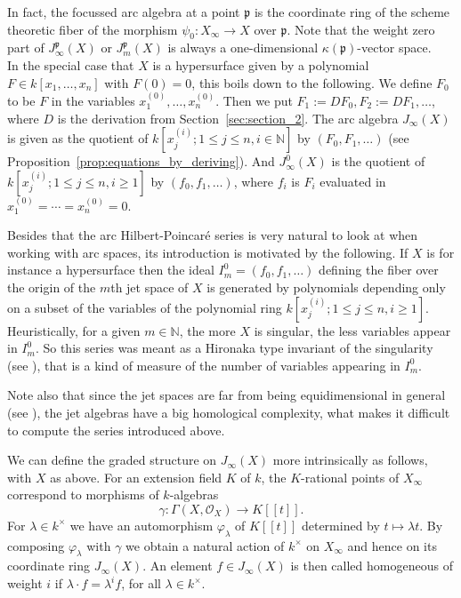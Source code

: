 In fact, the focussed arc algebra at a point $\mathfrak{p}$ is the coordinate ring of the scheme theoretic fiber of the morphism $\psi_0 : X_{\infty} \to X$ over $\mathfrak{p}$. Note that the weight zero part of $J_{\infty}^{\mathfrak{p}}(X)$ or $J_{m}^{\mathfrak{p}}(X)$ is always a one-dimensional $\kappa(\mathfrak{p})$-vector space. \\

In the special case that $X$ is a hypersurface given by a polynomial $F\in k[x_1,\ldots,x_n]$ with $F(0)=0$, this boils down to the following. We define $F_0$ to be $F$ in the variables $x_1^{(0)},\ldots , x_n^{(0)}$. Then we put $F_1:= DF_0, F_2:=DF_1,\ldots $, where $D$ is the derivation from Section~\ref{sec:section_2}.
The arc algebra $J_{\infty}(X)$ is given as the quotient of $k[x_j^{(i)}; 1\leq j\leq n, i\in \mathbb{N}]$ by $(F_0,F_1,\ldots )$ (see Proposition~\ref{prop:equations_by_deriving}). And $J_{\infty}^0(X)$ is the quotient of $k[x_j^{(i)}; 1\leq j\leq n, i\geq 1]$ by $(f_0,f_1,\ldots )$, where $f_i$ is $F_i$ evaluated in $x_1^{(0)}= \cdots = x_n^{(0)} = 0$.

\begin{Rem}
Besides that the arc Hilbert-Poincar\'{e} series is very natural to look
at when working with arc spaces, its introduction is motivated by the
following. If $X$ is for instance a hypersurface then the ideal $I_m^0 = (f_0,f_1,\ldots )$ defining the fiber over the origin of the $m$th jet space of $X$ is generated by polynomials depending only on a subset of the variables
of the polynomial ring $k[x_j^{(i)}; 1\leq j\leq n, i\geq 1]$. Heuristically,
for a given $m \in \mathbb{N}$, the more $X$ is singular, the less
variables appear in $I_m^0$. So this series was meant as a
Hironaka type invariant of the singularity (see
\cite{berthomieu_hivert_mourtada}), that is a kind of measure of the
number of variables appearing in $I^{0}_m$.

Note also that since the jet spaces are far from being equidimensional
in general (see
\cite{mourtada_plane_branches,mourtada_toric_surfaces}), the jet
algebras have a big homological complexity, what makes it difficult to
compute the series introduced above.
\end{Rem}

\begin{Rem}\label{rem:graded_structure}
We can define the graded structure on $J_{\infty}(X)$ more intrinsically as follows, with $X$ as above. For an extension field $K$ of $k$, the $K$-rational points of $X_{\infty}$ correspond to morphisms of $k$-algebras
\[  \gamma : \Gamma(X,\mathcal{O}_X) \to K[[t]]. \]
For $\lambda\in k^{\times}$ we have an automorphism $\varphi_{\lambda}$ of $K[[t]]$ determined by $t\mapsto \lambda t$. By composing $\varphi_{\lambda}$ with $\gamma$ we obtain a natural action of $k^{\times}$ on $X_{\infty}$ and hence on its coordinate ring $J_{\infty}(X)$. An element $f\in J_{\infty}(X)$ is then called homogeneous of weight $i$ if $\lambda\cdot f = \lambda^i f$, for all $\lambda \in k^{\times}$.  
\end{Rem}

